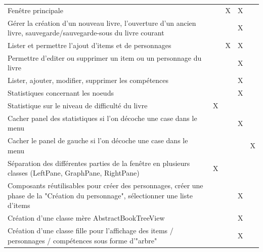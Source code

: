 \begin{centering}
\begin{longtable}{|p{8cm}|c|c|c|c|}
				\rowcolor{lightgray} \multicolumn{5}{|c|}{ \textbf{Fenêtre}}\\
				\hline
				Fenêtre principale & & X & X & \\
				\hline
				Gérer la création d'un nouveau livre, l'ouverture d'un ancien livre, sauvegarde/sauvegarde-sous du livre courant & & & X & \\
				\hline
				Lister et permettre l'ajout d'items et de personnages & & X & X & \\
				\hline
				Permettre d'editer ou supprimer un item ou un personnage du livre & & & X & \\
				\hline
				Lister, ajouter, modifier, supprimer les compétences & & & X & \\
				\hline
				Statistiques concernant les noeuds & & & X & \\
				\hline
				Statistique sur le niveau de difficulté du livre & X & & & \\
				\hline
				Cacher panel des statistiques si l'on décoche une case dans le menu & & & X & \\
				\hline
				Cacher le panel de gauche si l'on décoche une case dans le menu & & & & X\\
				\hline
				Séparation des différentes parties de la fenêtre en plusieurs classes (LeftPane, GraphPane, RightPane) & X & & & \\
				\hline
				Composants réutilisables pour créer des personnages, créer une phase de la "Création du personnage", sélectionner une liste d'items & & & X & \\
				\hline
				Création d'une classe mère AbstractBookTreeView & & & X & \\
				\hline
				Création d'une classe fille pour l'affichage des items / personnages / compétences sous forme d'"arbre" & & & X & \\
				\hline


\end{longtable}
\end{centering}
